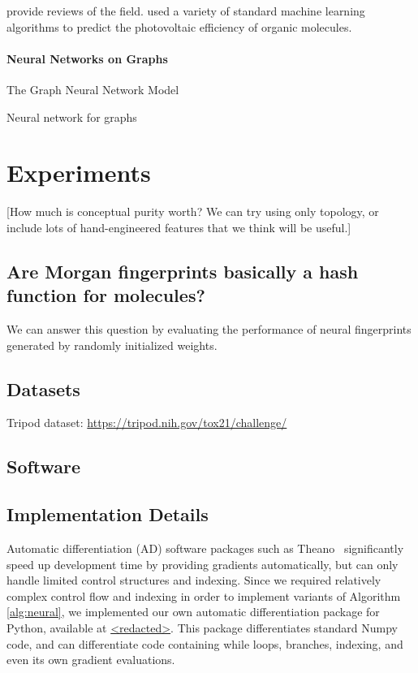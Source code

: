 \documentclass{article}
\begin{document}
\cite{Eckert2007225, bergeron2011modeling} provide reviews of the field.
\cite{tingley2014towards} used a variety of standard machine learning algorithms to predict the photovoltaic efficiency of organic molecules.

\paragraph{Neural Networks on Graphs}

\cite{graphnn2009} The Graph Neural Network Model

\cite{micheli2009neural} Neural network for graphs



\section{Experiments}

[How much is conceptual purity worth?  We can try using only topology, or include lots of hand-engineered features that we think will be useful.]

\subsection{Are Morgan fingerprints basically a hash function for molecules?}

We can answer this question by evaluating the performance of neural fingerprints generated by randomly initialized weights.


\subsection{Datasets}

Tripod dataset: \url{https://tripod.nih.gov/tox21/challenge/}
\cite{unterthiner2015toxicity}


\subsection{Software}

\subsection{Implementation Details}
Automatic differentiation (AD) software packages such as
Theano~\citep{Bastien-Theano-2012, bergstra2010scipy} significantly speed up development time by providing gradients automatically, but can only handle limited control structures and indexing.
Since we required relatively complex control flow and indexing in order to implement variants of Algorithm \ref{alg:neural}, we implemented our own automatic differentiation package for Python, available at \url{<redacted>}.
This package differentiates standard Numpy~\citep{oliphant2007python} code, and can differentiate code containing
while loops, branches, indexing, and even its own gradient evaluations.
\end{document}

